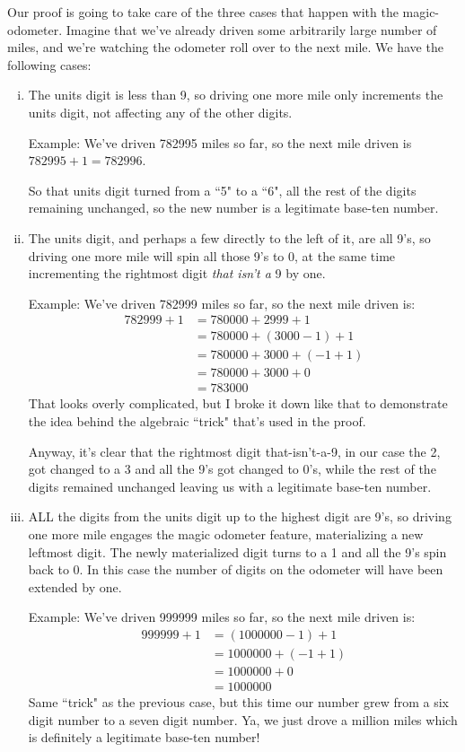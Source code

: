\documentclass{article}
\begin{document}
Our proof is going to take care of the three cases that happen with
the magic-odometer. Imagine that we've already driven some arbitrarily large
number of miles, and we're watching the odometer roll over to the
next mile. We have the following cases:

\begin{enumerate}[i)]
\item The units digit is less than 9, so driving one more mile only increments
the units digit, not affecting any of the other digits.

Example: We've driven 782995 miles so far, so the next mile driven is
$782995 + 1 = 782996$.

So that units digit turned from a ``5" to a ``6", all the rest of
the digits remaining unchanged,
so the new number is a legitimate base-ten number.
\item The units digit, and perhaps a few directly to the left of it, are all 9's,
so driving one more mile will spin all those 9's to 0,
at the same time incrementing
the rightmost digit \emph{that isn't a} 9 by one.

Example: We've driven 782999 miles so far, so the next mile driven is:
\begin{align*}
782999+1 &= 780000+2999+1\\
&=780000+(3000-1)+1\\
&=780000+3000+(-1+1)\\
&=780000+3000+0\\
&=783000
\end{align*}
That looks overly complicated, but I broke it down
like that to demonstrate the idea behind the algebraic ``trick" that's
used in the proof.

Anyway, it's clear that the rightmost digit that-isn't-a-9, in our case the 2, got changed
to a 3 and all the 9's got changed to 0's, while the rest of the digits remained unchanged
leaving us with a legitimate base-ten number.
\item ALL the digits from the units digit up to the highest digit are 9's,
so driving one more mile
engages the magic odometer feature, materializing a new leftmost digit.
The newly materialized digit turns to a 1 and all the 9's spin back to 0.
In this case the number of digits on the odometer will have been extended by one.

Example: We've driven 999999 miles so far, so the next mile driven is:
\begin{align*}
999999+1 &=(1000000-1)+1\\
&=1000000+(-1+1)\\
&=1000000+0\\
&=1000000
\end{align*}
Same ``trick" as the previous case, but this time our number grew from a
six digit number to a seven digit number. Ya, we just drove a million miles
which is definitely a legitimate base-ten number!
\end{enumerate}
\end{document}
